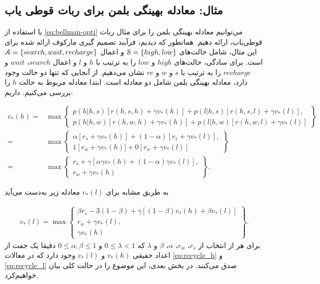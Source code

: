 \subsection{مثال: معادله بهینگی بلمن برای ربات قوطی یاب }
با استفاده از 
\ref{eq:bellman-opti}
می‌توانیم معادله بهینگی بلمن را برای مثال ربات قوطی‌یاب، ارائه دهیم. همانطور که دیدیم، فرآیند تصمیم گیری مارکوف ارائه شده برای این مثال، شامل حالت‌های 
$\EuScript{S} = \{high, low\}$
و اعمال 
$\EuScript{A} = \{search, wait, recharge\}$
است.
برای سادگی، حالت‌های $high$ و $low$ را به ترتیب با $h$ و $l$ و اعمال $search$،
$wait$
و
$recharge$
را به ترتیب با $s$ و $w$ و $re$ نشان می‌دهیم. از آنجایی که تنها دو حالت وجود دارد، معادله بهینگی بلمن شامل دو معادله است. ابتدا معادله مربوط به حالت $h$ را بررسی می‌کنیم. داریم:

\begin{align}
v_*(h) =& \max \left\{ 
\begin{array}{lr}
   p(h|h,s) \left[ r(h,s,h)+ \gamma v_*(h) \right] + p(l|h,s) \left[ r(h,s,l)+\gamma v_*(l) \right], \\ 
   p(h|h,w)[r(h,w,h)+ \gamma v_*(h)]+p(l|h,w)[r(h,w,l)+\gamma v_*(l)]
\end{array}
\right\} \nonumber \\
 =& \max \left\{ 
\begin{array}{lr}
   \alpha \left[ r_s+ \gamma v_*(h) \right] + (1 - \alpha) \left[ r_s+\gamma v_*(l) \right], \\ 
   1 \left[ r_w + \gamma v_*(h)]+ 0[r_w + \gamma v_*(l)]
\end{array}
\right\} \\
 =& \max \left\{ 
\begin{array}{lr}
   r_s + \gamma \left[  \alpha \gamma v_*(h) + (1 - \alpha) \gamma v_*(l) \right], \\ 
   r_w + \gamma v_* (h)
\end{array}
\right\}.
\label{eq:recycle_h}
\end{align}


به طریق مشابه برای 
$v_*(l)$
معادله زیر به‌دست می‌آید


\begin{align}
	v_*(l) = \max \left \{ 
	\begin{array}{lr}
		\beta r_s - 3(1-\beta) + \gamma \left[ (1-\beta) v_*(h)+\beta v_*(l)\right] \\
		r_w + \gamma v_*(l), \\
		\gamma v_*(h)
	\end{array}
	\right \}.
	\label{eq:recycle_l}
\end{align}
برای هر از انتخاب از 
$r_s$،
$r_w$،
$\alpha$،
$\beta$
و $\lambda$ که 
$0 \le \lambda < 1$
و
$0 \le \alpha,\beta \le 1$
دقیقا یک جفت از اعداد حقیقی 
$v_*(h)$
و 
$v_*(l)$
وجود دارد که در معالات
\ref{eq:recycle_h}
و
\ref{eq:recycle_l}
 صدق می‌کنند\cite{suttonbook}. در بخش بعدی، این موضوع را در حالت کلی بیان خواهیم‌کرد.




